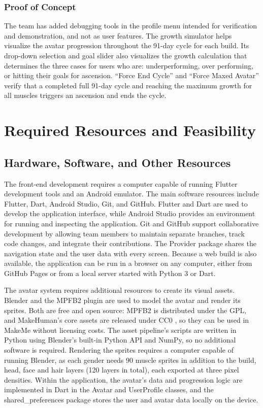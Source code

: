 \documentclass[11pt]{article}
\begin{document}
\subsubsection{Proof of Concept}
\label{sec:proofofconcept}
The team has added debugging tools in the profile menu intended for verification and demonstration, and not
as user features. The growth simulator helps visualize the avatar progression throughout the 91-day cycle for
each build. Its drop-down selection and goal slider also visualizes the growth calculation that determines
the three cases for users who are: underperforming, over performing, or hitting their goals for ascension.
“Force End Cycle” and “Force Maxed Avatar” verify that a completed full 91-day cycle and reaching the maximum
growth for all muscles triggers an ascension and ends the cycle.



\section{Required Resources and Feasibility}

\subsection{Hardware, Software, and Other Resources}
The front-end development requires a computer capable of running Flutter development tools and an Android emulator. The main software resources include Flutter, Dart, Android Studio, Git, and GitHub.
Flutter and Dart are used to develop the application interface, while Android Studio provides an environment for running and inspecting the application. Git and GitHub support collaborative development by allowing team members to maintain separate branches, track code changes, and integrate their contributions. The Provider package shares the navigation state and the user data with every screen. Because a web build is also available, the application can be run in a browser on any computer, either from GitHub Pages or from a local server started with Python 3 or Dart.

The avatar system requires additional resources to create its visual assets. Blender \cite{blender} and the MPFB2 plugin \cite{mpfb2} are used to model the avatar and render its sprites. Both are free and open source: MPFB2 is distributed under the GPL, and MakeHuman's core assets are released under CC0 \cite{makehumanlicense}, so they can be used in MakeMe without licensing costs. The asset pipeline's scripts are written in Python using Blender's built-in Python API and NumPy, so no additional software is required. Rendering the sprites requires a computer capable of running Blender, as each gender needs 90 muscle sprites in addition to the build, head, face and hair layers (120 layers in total), each exported at three pixel densities. Within the application, the avatar's data and progression logic are implemented in Dart in the Avatar and UserProfile classes, and the shared\_preferences package stores the user and avatar data locally on the device.
\end{document}
